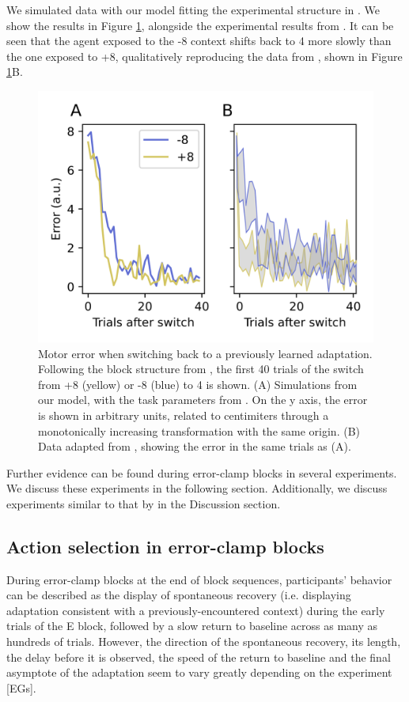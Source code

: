 \documentclass[a4paper,doc,floatsintext,natbib]{apa6}
\def \fref #1{Figure \ref{#1}}     %
\begin{document}
We simulated data with our model fitting the experimental structure in \cite{Davidson_Scaling_2004}. We show the results in \fref{fig:davidson-2004}, alongside the experimental results from \cite{Davidson_Scaling_2004}. It can be seen that the agent exposed to the -8 context shifts back to 4 more slowly than the one exposed to +8, qualitatively reproducing the data from \cite{Davidson_Scaling_2004}, shown in \fref{fig:davidson-2004}B.

\begin{figure}
\centering
\includegraphics{./figures/figure_3.png}
\caption{Motor error when switching back to a previously learned adaptation. Following the block structure from \cite{Davidson_Scaling_2004}, the first 40 trials of the switch from +8 (yellow) or -8 (blue) to 4 is shown. (A) Simulations from our model, with the task parameters from \cite{Davidson_Scaling_2004}. On the y axis, the error is shown in arbitrary units, related to centimiters through a monotonically increasing transformation with the same origin. (B) Data adapted from \cite{Davidson_Scaling_2004}, showing the error in the same trials as (A).}
\label{fig:davidson-2004}
\end{figure}

Further evidence can be found during error-clamp blocks in several experiments. We discuss these experiments in the following section. Additionally, we discuss experiments similar to that by \cite{Davidson_Scaling_2004} in the Discussion section.


\subsection{Action selection in error-clamp blocks}
During error-clamp blocks at the end of block sequences, participants' behavior can be described as the display of spontaneous recovery (i.e. displaying adaptation consistent with a previously-encountered context) during the early trials of the E block, followed by a slow return to baseline across as many as hundreds of trials. However, the direction of the spontaneous recovery, its length, the delay before it is observed, the speed of the return to baseline and the final asymptote of the adaptation seem to vary greatly depending on the experiment [EGs].
\end{document}
